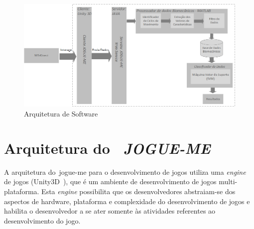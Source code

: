 


\begin{figure}[!h]
 \centering
  \includegraphics[scale=0.56]{./img/arquitetura.png}
\caption[Arquitetura de software]{Arquitetura de Software}
 \label{fig:arquitetura}
\end{figure}

\section{Arquitetura do ~\textit{JOGUE-ME}}\label{sec:cliente_game}
A arquitetura do~\ac{jogue-me} para o desenvolvimento de jogos utiliza uma \textit{engine} de jogos (Unity3D~\cite{unity3d}), que é um ambiente de desenvolvimento de jogos multi-plataforma. Esta \textit{engine} possibilita que os desenvolvedores abstraiam-se dos aspectos de hardware, plataforma e complexidade do desenvolvimento de jogos e habilita o desenvolvedor a se ater somente às atividades referentes ao desenvolvimento do jogo.

